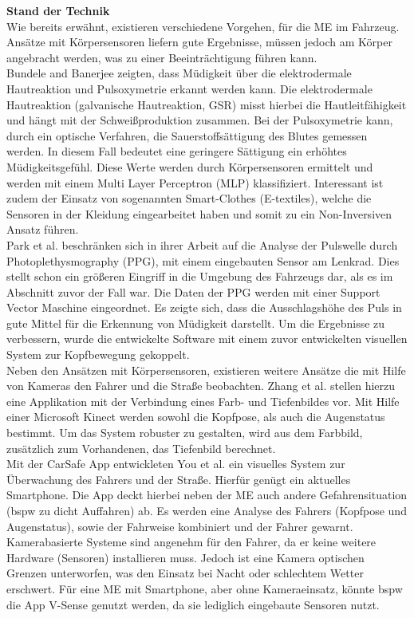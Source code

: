 {\textbf{Stand der Technik} \\
Wie bereits erwähnt, existieren verschiedene Vorgehen, für die \acl{ME} im Fahrzeug. Ansätze mit Körpersensoren liefern gute Ergebnisse, müssen jedoch am Körper angebracht werden, was zu einer Beeinträchtigung führen kann.\\

Bundele and Banerjee \citep{Bundele:2009:DFV:1806338.1806478} zeigten, dass Müdigkeit über die elektrodermale Hautreaktion und Pulsoxymetrie erkannt werden kann. Die elektrodermale Hautreaktion (galvanische Hautreaktion, GSR) misst hierbei die Hautleitfähigkeit und hängt mit der Schweißproduktion zusammen. Bei der Pulsoxymetrie kann, durch ein optische Verfahren, die Sauerstoffsättigung des Blutes gemessen werden. In diesem Fall bedeutet eine geringere Sättigung ein erhöhtes Müdigkeitsgefühl. Diese Werte werden durch Körpersensoren ermittelt und werden mit einem Multi Layer Perceptron (MLP) klassifiziert. Interessant ist zudem der Einsatz von sogenannten Smart-Clothes (E-textiles), welche die Sensoren in der Kleidung eingearbeitet haben und somit zu ein Non-Inversiven Ansatz führen.\\

Park et al. \cite{Park:2009:DDD:1667780.1667798} beschränken sich in ihrer Arbeit auf die Analyse der Pulswelle durch Photoplethysmography (PPG), mit einem eingebauten Sensor am Lenkrad. Dies stellt schon ein größeren Eingriff in die Umgebung des Fahrzeugs dar, als es im Abschnitt zuvor der Fall war. Die Daten der PPG werden mit einer Support Vector Maschine eingeordnet. Es zeigte sich, dass die Ausschlagshöhe des Puls in gute Mittel für die Erkennung von Müdigkeit darstellt. Um die Ergebnisse zu verbessern, wurde die entwickelte Software mit einem zuvor entwickelten visuellen System zur Kopfbewegung gekoppelt. \\

Neben den Ansätzen mit Körpersensoren, existieren weitere Ansätze die mit Hilfe von Kameras den Fahrer und die Straße beobachten. Zhang et al. \cite{Zhang:2015:RSD:2753829.2629482} stellen hierzu eine Applikation mit der Verbindung eines Farb- und Tiefenbildes vor. Mit Hilfe einer Microsoft Kinect werden sowohl die Kopfpose, als auch die Augenstatus bestimmt. Um das System robuster zu gestalten, wird aus dem Farbbild,  zusätzlich zum Vorhandenen, das Tiefenbild berechnet.\\

Mit der CarSafe App entwickleten You et al. \cite{You:2013:CAA:2462456.2465428} ein visuelles System zur Überwachung des Fahrers und der Straße. Hierfür genügt ein aktuelles Smartphone. Die App deckt hierbei neben der \acl{ME} auch andere Gefahrensituation (\acl{bspw} zu dicht Auffahren) ab. Es werden eine Analyse des Fahrers (Kopfpose und Augenstatus), sowie der Fahrweise kombiniert und der Fahrer gewarnt. Kamerabasierte Systeme sind angenehm für den Fahrer, da er keine weitere Hardware (Sensoren) installieren muss. Jedoch ist eine Kamera optischen Grenzen unterworfen, was den Einsatz bei Nacht oder schlechtem Wetter erschwert. Für eine \acl{ME} mit Smartphone, aber ohne Kameraeinsatz, könnte \acl{bspw} die App V-Sense \cite{Chen:2015:ISV:2742647.2742659} genutzt werden, da sie lediglich  eingebaute Sensoren nutzt.

}
